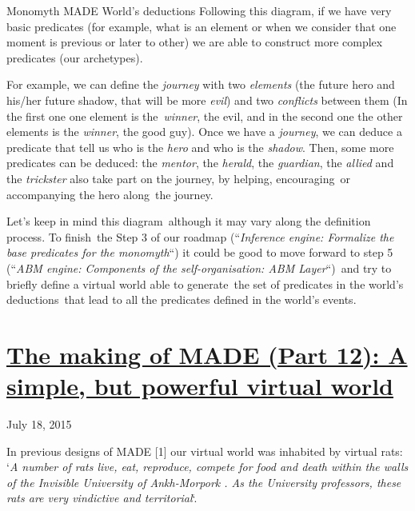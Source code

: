 \documentclass[a4paper]{article}
\newcommand\textstyleEmphasis[1]{\textit{#1}}
\begin{document}
Monomyth MADE World{\textquoteright}s deductions
Following this diagram, if we have very basic predicates (for example,
what is an element or when we consider that one moment is previous or
later to other) we are able to construct more complex predicates (our
archetypes).

For example, we can define the \textstyleEmphasis{journey} with two
\textstyleEmphasis{elements} (the future hero and his/her future
shadow, that will be more \textstyleEmphasis{evil}) and two
\textstyleEmphasis{conflicts} between them (In the first one one
element is the~\textstyleEmphasis{winner}, the evil, and in the second
one the other elements is the \textstyleEmphasis{winner}, the good
guy). Once we have a \textstyleEmphasis{journey}, we can deduce a
predicate that tell us who is the \textstyleEmphasis{hero} and who is
the \textstyleEmphasis{shadow}. Then, some more predicates can be
deduced: the \textstyleEmphasis{mentor}, the
\textstyleEmphasis{herald}, the \textstyleEmphasis{guardian}, the
\textstyleEmphasis{allied} and the \textstyleEmphasis{trickster} also
take part on the journey, by helping, encouraging~or accompanying the
hero along~the journey.

Let{\textquoteright}s keep in mind this diagram~although it may vary
along the definition process. To finish~the Step 3 of our roadmap
({\textquotedblleft}\textstyleEmphasis{Inference engine: Formalize the
base predicates for the monomyth}{\textquotedblleft}) it could be good
to move forward to step 5 ({\textquotedblleft}\textstyleEmphasis{ABM
engine: Components of the self-organisation: ABM
Layer}{\textquotedblleft})~and try to briefly define a virtual world
able to generate~the set of predicates in the world{\textquoteright}s
deductions~that lead to all the predicates defined in the
world{\textquoteright}s events.


\bigskip

\clearpage\section[The making of MADE (Part 12): A simple, but powerful
virtual
world]{\href{http://www.velonuboso.com/made/2015/07/18/making-part-12-simple-powerful-virtual-world/}{The
making of MADE (Part 12): A simple, but powerful virtual world}}
July 18, 2015

In previous designs of MADE [1] our virtual world was inhabited by
virtual rats: {\textquoteleft}\textstyleEmphasis{A number of rats live,
eat, reproduce, compete for food and death within the walls of the
Invisible University of Ankh-Morpork . As the University professors,
these rats are very vindictive and territorial}{\textquoteleft}.
\end{document}

